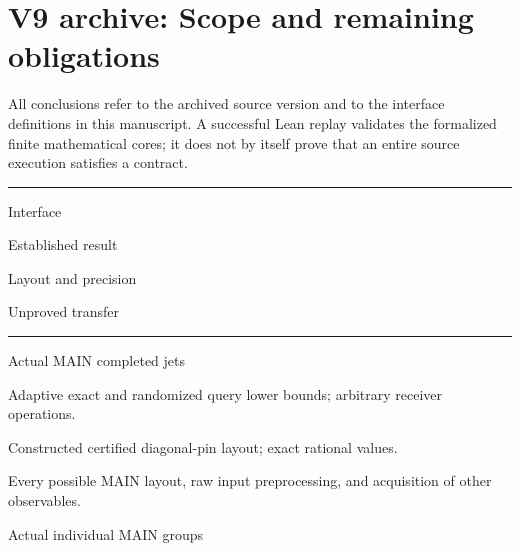 \documentclass[11pt,a4paper]{article}
\newlength{\OfflineResearchTableWidth}
\newcommand{\OfflineResearchHeaderRule}{\noindent\rule{\linewidth}{0.45pt}\par}
\newcommand{\OfflineResearchRow}{\par}
\newenvironment{OfflineResearchTable}{%
  \par\medskip\begingroup\small\setlength{\parindent}{0pt}%
  \setlength{\parskip}{3pt plus 1pt minus .5pt}%
  \setlength{\OfflineResearchTableWidth}{\linewidth}%
}{%
  \par\endgroup\medskip%
}
\begin{document}
\section{V9 archive: Scope and remaining obligations}\label{v9-section-coverage}

All conclusions refer to the archived source version and to the
interface definitions in this manuscript. A successful Lean replay
validates the formalized finite mathematical cores; it does not by
itself prove that an entire source execution satisfies a contract.

\begin{OfflineResearchTable}
\OfflineResearchHeaderRule
\noindent%
\begin{minipage}[t]{0.17955\OfflineResearchTableWidth}\raggedright
Interface
\end{minipage}\hfill%
\begin{minipage}[t]{0.22680\OfflineResearchTableWidth}\raggedright
Established result
\end{minipage}\hfill%
\begin{minipage}[t]{0.23625\OfflineResearchTableWidth}\raggedright
Layout and precision
\end{minipage}\hfill%
\begin{minipage}[t]{0.30240\OfflineResearchTableWidth}\raggedright
Unproved transfer
\end{minipage}%
\OfflineResearchRow
\nobreak
\OfflineResearchHeaderRule
\nobreak
\noindent%
\begin{minipage}[t]{0.17955\OfflineResearchTableWidth}\raggedright
Actual MAIN completed jets
\end{minipage}\hfill%
\begin{minipage}[t]{0.22680\OfflineResearchTableWidth}\raggedright
Adaptive exact and randomized query lower
bounds; arbitrary receiver operations.
\end{minipage}\hfill%
\begin{minipage}[t]{0.23625\OfflineResearchTableWidth}\raggedright
Constructed certified
diagonal-pin layout; exact rational values.
\end{minipage}\hfill%
\begin{minipage}[t]{0.30240\OfflineResearchTableWidth}\raggedright
Every possible MAIN
layout, raw input preprocessing, and acquisition of other
observables.
\end{minipage}%
\OfflineResearchRow
\noindent%
\begin{minipage}[t]{0.17955\OfflineResearchTableWidth}\raggedright
Actual individual MAIN groups

\end{minipage}
\end{OfflineResearchTable}
\end{document}
